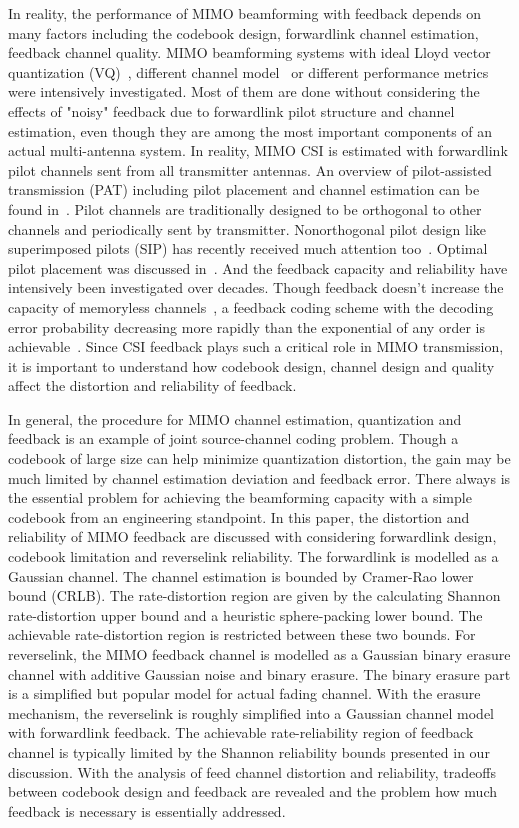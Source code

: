 \documentclass[10pt,fleqn, twocolumn]{IEEEtran}
\begin{document}
In reality, the performance of MIMO beamforming with feedback
depends on many factors including the codebook design, forwardlink
channel estimation, feedback channel quality. MIMO beamforming
systems with ideal Lloyd vector quantization (VQ)~\cite{Narula98},
different channel model~\cite{Mukka03} or different performance
metrics~\cite{PXia04,Roh04} were intensively investigated. Most of
them are done without considering the effects of "noisy" feedback
due to forwardlink pilot structure and channel estimation, even
though they are among the most important components of an actual
multi-antenna system. In reality, MIMO CSI is estimated with
forwardlink pilot channels sent from all transmitter antennas. An
overview of pilot-assisted transmission (PAT) including pilot
placement and channel estimation can be found in~\cite{Tong04}.
Pilot channels are traditionally designed to be orthogonal to
other channels and periodically sent by transmitter. Nonorthogonal
pilot design like superimposed pilots (SIP) has recently received
much attention too~\cite{Coldrey06}. Optimal pilot placement was
discussed in~\cite{Dong02}. And the feedback capacity and
reliability have intensively been investigated over decades.
Though feedback doesn't increase the capacity of memoryless
channels~\cite{Shannon56,Kim06}, a feedback coding scheme with the
decoding error probability decreasing more rapidly than the
exponential of any order is achievable~\cite{Kramer69}. Since CSI
feedback plays such a critical role in MIMO transmission, it is
important to understand how codebook design, channel design and
quality affect the distortion and reliability of feedback.

In general, the procedure for MIMO channel estimation,
quantization and feedback is an example of joint source-channel
coding problem. Though a codebook of large size can help minimize
quantization distortion, the gain may be much limited by channel
estimation deviation and feedback error. There always is the
essential problem for achieving the beamforming capacity with a
simple codebook from an engineering standpoint. In this paper, the
distortion and reliability of MIMO feedback are discussed with
considering forwardlink design, codebook limitation and
reverselink reliability. The forwardlink is modelled as a Gaussian
channel. The channel estimation is bounded by Cramer-Rao lower
bound (CRLB). The rate-distortion region are given by the
calculating Shannon rate-distortion upper bound and a heuristic
sphere-packing lower bound. The achievable rate-distortion region
is restricted between these two bounds. For reverselink, the MIMO
feedback channel is modelled as a Gaussian binary erasure channel
with additive Gaussian noise and binary erasure. The binary
erasure part is a simplified but popular model for actual fading
channel. With the erasure mechanism, the reverselink is roughly
simplified into a Gaussian channel model with forwardlink
feedback. The achievable rate-reliability region of feedback
channel is typically limited by the Shannon reliability bounds
presented in our discussion. With the analysis of feed channel
distortion and reliability, tradeoffs between codebook design and
feedback are revealed and the problem how much feedback is
necessary is essentially addressed.
\end{document}
